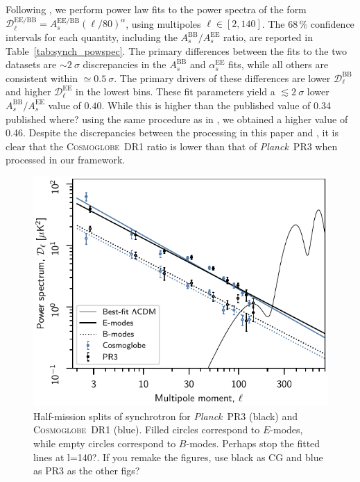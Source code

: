 \documentclass[twocolumn]{../../common/aa}
\def\Planck{\emph{Planck}}
\newcommand{\red}[0]{\color{red}}
\newcommand{\cosmoglobe}{\textsc{Cosmoglobe}}
\begin{document}
Following \citet{planck2016-l04}, we perform power law fits to the power spectra of the form $\mathcal D_\ell^\mathrm{EE/BB}=A_s^{\mathrm{EE/BB}}(\ell/80)^\alpha$, using multipoles $\ell\in[2,140]$. The 68\,\% confidence intervals for each quantity, including the $A_s^\mathrm{BB}/A_s^\mathrm{EE}$ ratio, are reported in Table~\ref{tab:synch_powspec}. The primary differences between the fits to the two datasets are $\sim2~\sigma$ discrepancies in the $A_s^\mathrm{BB}$ and $\alpha_s^\mathrm{EE}$ fits, while all others are consistent within $\simeq0.5~\sigma$. The primary drivers of these differences are lower $\mathcal D_\ell^\mathrm{BB}$ and higher $\mathcal D_\ell^\mathrm{EE}$ in the lowest bins.
These fit parameters yield a $\lesssim2~\sigma$ lower $A_s^\mathrm{BB}/A_s^\mathrm{EE}$ value of $0.40$. While this is higher than the published value of 0.34 {\red published where?} using the same procedure as in \citet{planck2016-l04}, we obtained a higher value of 0.46. Despite the discrepancies between the processing in this paper and \citet{planck2016-l04}, it is clear that the \cosmoglobe\ DR1 ratio is lower than that of \Planck\ PR3 when processed in our framework.

\begin{figure}
        \centering
	\includegraphics[width=\linewidth]{figures/cls_synch_ratio.pdf}
        \caption{
		Half-mission splits of synchrotron for \Planck\ PR3 (black) and \cosmoglobe\ DR1 (blue). Filled circles correspond to $E$-modes, while empty circles correspond to $B$-modes. {\red Perhaps stop the fitted lines at l=140?. If you remake the figures, use black as CG and blue as PR3 as the other figs?}
        }
        \label{fig:spectra}
\end{figure}
\end{document}
